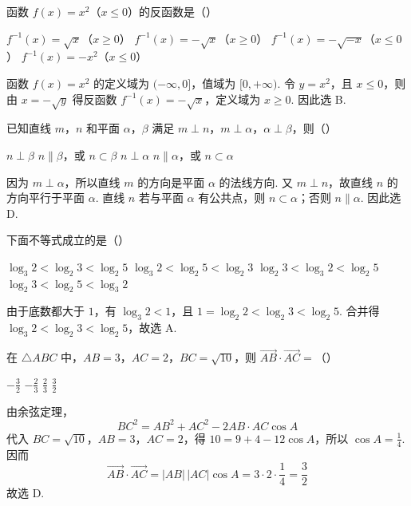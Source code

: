 \begin{problem}
函数 \( f(x) = x^{2} \)（\(x \leqslant 0\)）的反函数是（\quad）

\choices
    {\(f^{-1}(x) = \sqrt{x}\)（\(x\geqslant 0\)）}
    {\(f^{-1}(x) = -\sqrt{x}\)（\(x\geqslant 0\)）}
    {\(f^{-1}(x) = -\sqrt{-x}\)（\(x\leqslant 0\)）}
    {\(f^{-1}(x) = -x^{2}\)（\(x\leqslant 0\)）}

\begin{solution}
函数 \(f(x)=x^2\) 的定义域为 \((-\infty,0]\)，值域为 \([0,+\infty)\). 令 \(y=x^2\)，且 \(x\leqslant0\)，则由 \(x=-\sqrt y\) 得反函数
\(f^{-1}(x)=-\sqrt{x}\)，定义域为 \(x\geqslant0\). 因此选 B.
\end{solution}
\end{problem}

\begin{problem}
已知直线 \(m\)，\(n\) 和平面 \(\alpha\)，\(\beta\) 满足 \(m \perp n\)，\(m \perp \alpha\)，\(\alpha \perp \beta\)，则（\quad）

\choices
    {\(n \perp \beta\)}
    {\(n \parallel \beta\)，或 \(n \subset \beta\)}
    {\(n \perp \alpha\)}
    {\(n \parallel \alpha\)，或 \(n \subset \alpha\)}

\begin{solution}
因为 \(m\perp\alpha\)，所以直线 \(m\) 的方向是平面 \(\alpha\) 的法线方向. 又 \(m\perp n\)，故直线 \(n\) 的方向平行于平面 \(\alpha\). 直线 \(n\) 若与平面 \(\alpha\) 有公共点，则 \(n\subset\alpha\)；否则 \(n\parallel\alpha\). 因此选 D.
\end{solution}
\end{problem}

\begin{problem}
下面不等式成立的是（\quad）

\choices
    {\(\log_3 2 < \log_2 3 < \log_2 5\)}
    {\(\log_3 2 < \log_2 5 < \log_2 3\)}
    {\(\log_2 3 < \log_3 2 < \log_2 5\)}
    {\(\log_2 3 < \log_2 5 < \log_3 2\)}

\begin{solution}
由于底数都大于 \(1\)，有 \(\log_3 2<1\)，且
\(1=\log_2 2<\log_2 3<\log_2 5\). 合并得
\(\log_3 2<\log_2 3<\log_2 5\)，故选 A.
\end{solution}
\end{problem}

\begin{problem}
在 \(\triangle ABC\) 中，\(AB = 3\)，\(AC = 2\)，\(BC = \sqrt{10}\)，则 \(\overrightarrow{AB} \cdot \overrightarrow{AC} =\)（\quad）

\choices
    {\(-\frac{3}{2}\)}
    {\(-\frac{2}{3}\)}
    {\(\frac{2}{3}\)}
    {\(\frac{3}{2}\)}

\begin{solution}
由余弦定理，
\[
BC^2=AB^2+AC^2-2AB\cdot AC\cos A
\]
代入 \(BC=\sqrt{10}\)，\(AB=3\)，\(AC=2\)，得
\(10=9+4-12\cos A\)，所以 \(\cos A=\frac14\). 因而
\[
\overrightarrow{AB}\cdot\overrightarrow{AC}=|AB|\,|AC|\cos A
=3\cdot2\cdot\frac14=\frac32
\]
故选 D.
\end{solution}
\end{problem}


